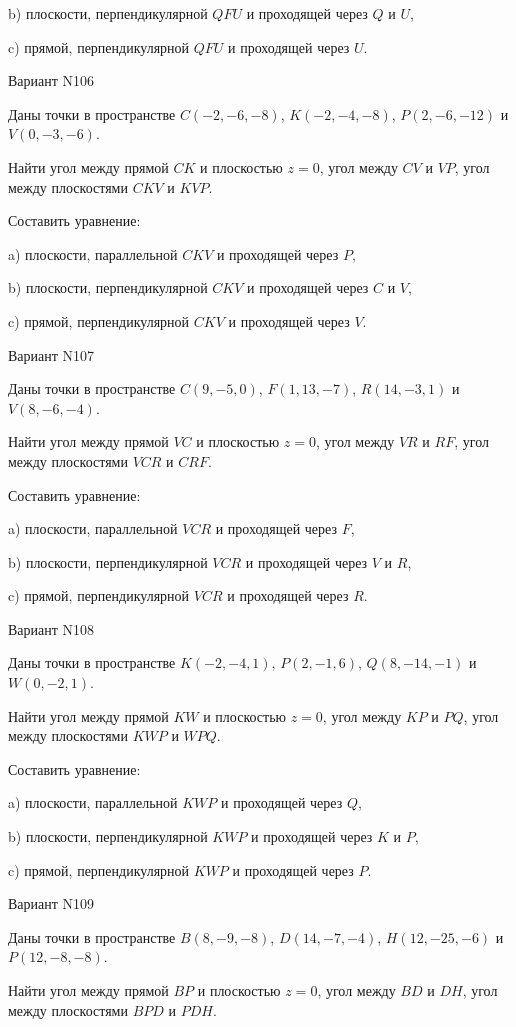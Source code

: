 \documentclass[11pt]{report}
\begin{document}
b) плоскости, перпендикулярной $QFU$ и проходящей через $Q$ и $U$,

c) прямой, перпендикулярной $QFU$ и проходящей через $U$.

Вариант N106

Даны точки в пространстве
$C(-2, -6, -8)$, $K(-2, -4, -8)$, $P(2, -6, -12)$ и
$V(0, -3, -6)$.

Найти угол между прямой $CK$ и плоскостью $z = 0$, угол между $CV$ и $VP$, угол между плоскостями $CKV$ 
и $KVP$.

Составить уравнение: 

a) плоскости, параллельной $CKV$ и проходящей через $P$,

b) плоскости, перпендикулярной $CKV$ и проходящей через $C$ и $V$,

c) прямой, перпендикулярной $CKV$ и проходящей через $V$.

Вариант N107

Даны точки в пространстве
$C(9, -5, 0)$, $F(1, 13, -7)$, $R(14, -3, 1)$ и
$V(8, -6, -4)$.

Найти угол между прямой $VC$ и плоскостью $z = 0$, угол между $VR$ и $RF$, угол между плоскостями $VCR$ 
и $CRF$.

Составить уравнение: 

a) плоскости, параллельной $VCR$ и проходящей через $F$,

b) плоскости, перпендикулярной $VCR$ и проходящей через $V$ и $R$,

c) прямой, перпендикулярной $VCR$ и проходящей через $R$.

Вариант N108

Даны точки в пространстве
$K(-2, -4, 1)$, $P(2, -1, 6)$, $Q(8, -14, -1)$ и
$W(0, -2, 1)$.

Найти угол между прямой $KW$ и плоскостью $z = 0$, угол между $KP$ и $PQ$, угол между плоскостями $KWP$ 
и $WPQ$.

Составить уравнение: 

a) плоскости, параллельной $KWP$ и проходящей через $Q$,

b) плоскости, перпендикулярной $KWP$ и проходящей через $K$ и $P$,

c) прямой, перпендикулярной $KWP$ и проходящей через $P$.

Вариант N109

Даны точки в пространстве
$B(8, -9, -8)$, $D(14, -7, -4)$, $H(12, -25, -6)$ и
$P(12, -8, -8)$.

Найти угол между прямой $BP$ и плоскостью $z = 0$, угол между $BD$ и $DH$, угол между плоскостями $BPD$ 
и $PDH$.
\end{document}
